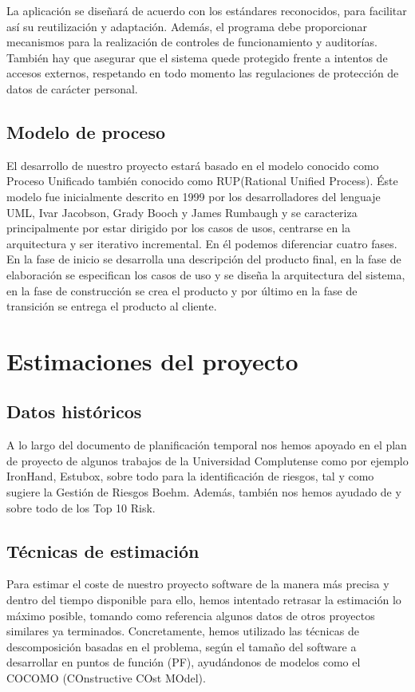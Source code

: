 \documentclass[11pt, a4paper, twoside, titlepage]{article}
\begin{document}
			La aplicación se diseñará de acuerdo con los estándares reconocidos, para facilitar así su reutilización y adaptación. Además, el programa debe proporcionar mecanismos para la realización de controles de funcionamiento y auditorías. También hay que asegurar que el sistema quede protegido frente a intentos de accesos externos, respetando en todo momento las regulaciones de protección de datos de carácter personal.

		\subsection{Modelo de proceso}
		El desarrollo de nuestro proyecto estará basado en el modelo conocido como Proceso Unificado también conocido como RUP(Rational Unified Process). Éste modelo fue inicialmente descrito en 1999 por los desarrolladores del lenguaje UML, Ivar Jacobson, Grady Booch y James Rumbaugh y se caracteriza principalmente por estar dirigido por los casos de usos, centrarse en la arquitectura y ser iterativo incremental. En él podemos diferenciar cuatro fases. En la fase de inicio se desarrolla una descripción del producto final, en la fase de elaboración se especifican los casos de uso y se diseña la arquitectura del sistema, en la fase de construcción se crea el producto y por último en la fase de transición se entrega el producto al cliente.

	\section{Estimaciones del proyecto}
		\subsection{Datos históricos}
		A lo largo del documento de planificación temporal nos hemos apoyado en el plan de proyecto de algunos trabajos de la Universidad Complutense como por ejemplo IronHand, Estubox, sobre todo para la identificación de riesgos, tal y como sugiere la Gestión de Riesgos Boehm. Además, también nos hemos ayudado de \cite{PSMAN} y sobre todo de los Top 10 Risk.
		\subsection{Técnicas de estimación}
		Para estimar el coste de nuestro proyecto software de la manera más precisa y dentro del tiempo disponible para ello, hemos intentado retrasar la estimación lo máximo posible, tomando como referencia algunos datos de otros proyectos similares ya terminados. Concretamente, hemos utilizado las técnicas de descomposición basadas en el problema, según el tamaño del software a desarrollar en puntos de función (PF), ayudándonos de modelos como el COCOMO (COnstructive COst MOdel).
\end{document}
